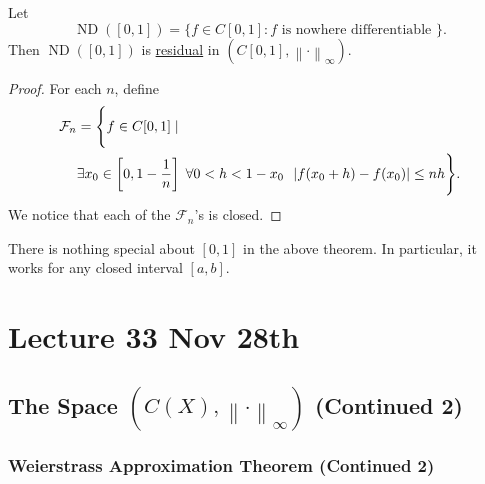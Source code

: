\documentclass[notoc,notitlepage]{tufte-book}
\DeclareMathOperator{\ND}{ND }
\newcommand{\norm}[1]{\left\| #1 \right\|}
\begin{document}
\begin{thm}\label{thm:banach_mazurkiewickz_theorem}
  Let
  \begin{equation*}
    \ND([0, 1]) = \{ f \in C[0, 1] : f \text{ is nowhere differentiable } \}.
  \end{equation*}
  Then $\ND([0, 1])$ is \hyperref[defn:residual]{residual} in $(C[0, 1], \norm\cdot_\infty)$.
\end{thm}

\begin{proof}
  For each $n$, define
  \begin{align*}
    \mathcal{F}_n &= \Bigg\{ f \in C[0, 1] \mid \\
                  & \exists x_0 \in \left[0, 1 - \frac{1}{n}\right] \; \forall 0 < h < 1 - x_0 \enspace \left| f(x_0 + h) - f(x_0) \right| \leq nh \Bigg\}.
  \end{align*}
  We notice that each of the $\mathcal{F}_n$'s is closed.  %
\end{proof}

\begin{remark}
  There is nothing special about $[0, 1]$ in the above theorem. In particular, it works for any closed interval $[a, b]$.
\end{remark}




\chapter{Lecture 33 Nov 28th}%
\label{chp:lecture_33_nov_28th}

\section{The Space $(C(X), \norm\cdot_\infty)$ (Continued 2)}%
\label{sec:the_space_c_x_normcdot_infty_continued_2}

\subsection{Weierstrass Approximation Theorem (Continued 2)}%
\label{sub:weierstrass_approximation_theorem_continued_2}
\end{document}
